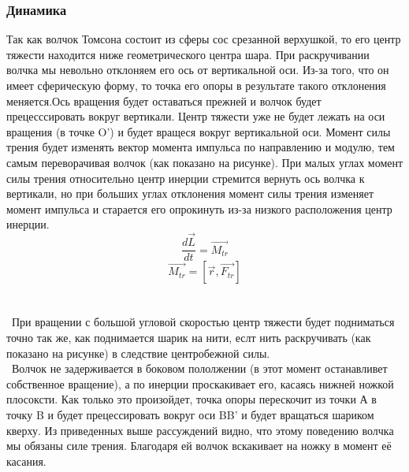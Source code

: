 \documentclass[a4paper, 12pt]{article}
\begin{document}
\subsubsection{Динамика}

Так как волчок Томсона состоит из сферы сос срезанной верхушкой, то его центр тяжести находится ниже геометрического центра шара.
При раскручивании волчка мы невольно отклоняем его ось от вертикальной оси. Из-за того, что он имеет сферическую форму, то точка его опоры в результате такого отклонения меняется.Ось вращения будет оставаться прежней и волчок будет прецесссировать вокруг вертикали. Центр тяжести уже не будет лежать на оси вращения (в точке O') и будет вращеся вокруг вертикальной оси. Момент силы трения будет изменять вектор момента импульса по направлению и модулю, тем самым переворачивая волчок (как показано на рисунке). При малых углах момент силы трения относительно центр инерции стремится вернуть ось волчка к вертикали, но при больших углах отклонения момент силы трения изменяет момент импульса и старается его опрокинуть из-за низкого расположения центр инерции.
\begin{equation}
		\frac{d \vec{L}}{dt} = \vec{M_{tr}}
\end{equation}
\begin{equation}
		\vec{M_{tr}} = [\vec{r}, \vec{F_{tr}}]
\end{equation}
\\\
\\\
При вращении с большой угловой скоростью центр тяжести будет подниматься точно так же, как поднимается шарик на нити, еслт нить раскручивать (как показано на рисунке) в следствие центробежной силы.
\newline
\\\
Волчок не задерживается в боковом пололжении (в этот момент останавливет собственное вращение), а по инерции проскакивает его, касаясь нижней ножкой плосоксти. Как только это произойдет, точка опоры перескочит из точки А в точку B и будет прецессировать вокруг оси BB' и будет вращаться шариком кверху.
Из приведенных выше рассуждений видно, что этому поведению волчка мы обязаны силе трения. Благодаря ей волчок вскакивает на ножку в момент её касания.
\end{document}
